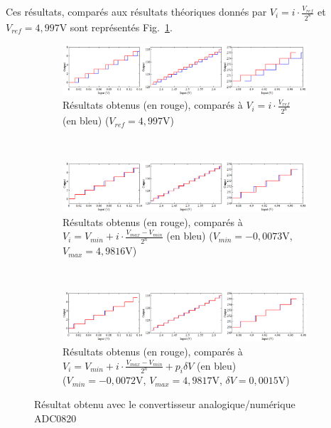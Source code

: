 \documentclass{article}
\begin{document}
Ces résultats, comparés aux résultats théoriques donnés par ${V_i = i\cdot\frac{V_{ref}}{2^8}}$ et ${V_{ref}=4,997\mathrm{V}}$ sont représentés Fig.~\ref{fig:ADCres1}.

\begin{figure}
  \centering
  \begin{subfigure}[b]{\textwidth}
    \centering
    \includegraphics[width=\textwidth]{ADCresults}
    \caption{Résultats obtenus (en rouge), comparés à ${V_i = i\cdot\frac{V_{ref}}{2^8}}$ (en bleu) (${V_{ref}=4,997\mathrm{V}}$)}
    \label{fig:ADCres1}
  \end{subfigure}
  \\
  \begin{subfigure}[b]{\textwidth}
    \centering
    \includegraphics[width=\textwidth]{ADCresults_lincorr}
    \caption{Résultats obtenus (en rouge), comparés à ${V_i = V_{min}+i\cdot\frac{V_{max}-V_{min}}{2^n}}$ (en bleu) (${V_{min}=-0,0073\mathrm{V}}$, ${V_{max}=4,9816\mathrm{V}}$)}
    \label{fig:ADCres2}
  \end{subfigure}
  \\
  \begin{subfigure}[b]{\textwidth}
    \centering
    \includegraphics[width=\textwidth]{ADCresults_corr}
    \caption{Résultats obtenus (en rouge), comparés à ${V_i = V_{min}+i\cdot\frac{V_{max}-V_{min}}{2^n}}+p_i\delta V$ (en bleu) \\(${V_{min}=-0,0072\mathrm{V}}$, ${V_{max}=4,9817\mathrm{V}}$, ${\delta V=0,0015\mathrm{V}}$)}
    \label{fig:ADCres3}
  \end{subfigure}
  \caption{Résultat obtenu avec le convertisseur analogique/numérique ADC0820}
  \label{fig:ADCres}
\end{figure}
\end{document}
